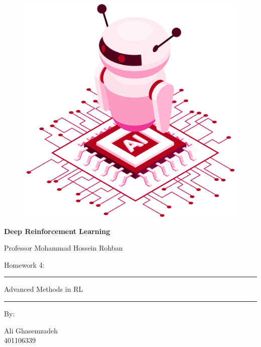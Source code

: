 \documentclass[12pt]{article}
\begin{document}
\thispagestyle{plain}

\begin{center}

\vspace*{-1.5cm}
\begin{figure}[!h]
    \centering
    \includegraphics[width=0.7\linewidth]{figs/cover-std.png}
\end{figure}

{

{\color{DarkBlue} {\fontsize{30}{50} \textbf{
Deep Reinforcement Learning
}}}

{\color{DarkBlue} {\Large
Professor Mohammad Hossein Rohban
}}
}


\vspace{20pt}

{


{\color{RedOrange}
{\Large
Homework 4:
}\\
}
{\color{BrickRed}
\rule{12cm}{0.5pt}

{\Huge
Advanced Methods in RL
}
\rule{12cm}{0.5pt}
}

\vspace{10pt}

{\color{RoyalPurple} { \small By:} } \\
\vspace{10pt}

{\color{Blue} { \LARGE Ali Ghasemzadeh } } \\
\vspace{5pt}
{\color{RoyalBlue} { \Large 401106339 } }


}
\end{center}
\end{document}
